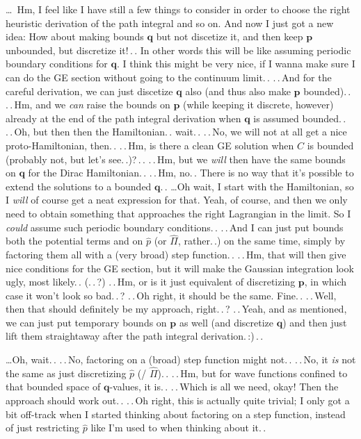 \documentclass{report}
\begin{document}
\ldots\ Hm, I feel like I have still a few things to consider in order to choose the right heuristic derivation of the path integral and so on. And now I just got a new idea: How about making bounds $\boldsymbol{q}$ but not discetize it, and then keep $\boldsymbol{p}$ unbounded, but discretize it!\,.\,. In other words this will be like assuming periodic boundary conditions for $\boldsymbol{q}$. I think this might be very nice, if I wanna make sure I can do the GE section without going to the continuum limit.\,. .\,.\,And for the careful derivation, we can just discetize $\boldsymbol{q}$ also (and thus also make $\boldsymbol{p}$ bounded).\,. .\,.\,Hm, and we \emph{can} raise the bounds on $\boldsymbol{p}$ (while keeping it discrete, however) already at the end of the path integral derivation when $\boldsymbol{q}$ is assumed bounded.\,. .\,.\,Oh, but then then the Hamiltonian.\,. wait.\,. .\,.\,No, we will not at all get a nice proto-Hamiltonian, then.\,. .\,.\,Hm, is there a clean GE solution when $C$ is bounded (probably not, but let's see.\,.)?\,.\,. .\,.\,Hm, but we \emph{will} then have the same bounds on $\boldsymbol{q}$ for the Dirac Hamiltonian.\,. 
.\,.\,Hm, no.\,. There is no way that it's possible to extend the solutions to a bounded $\boldsymbol{q}$.\,. \ldots Oh wait, I start with the Hamiltonian, so I \emph{will} of course get a neat expression for that. Yeah, of course, and then we only need to obtain something that approaches the right Lagrangian in the limit. So I \emph{could} assume such periodic boundary conditions.\,. .\,.\,And I can just put bounds both the potential terms and on $\hat p$ (or $\hat \Pi$, rather.\,.) on the same time, simply by factoring them all with a (very broad) step function.\,. .\,.\,Hm, that will then give nice conditions for the GE section, but it will make the Gaussian integration look ugly, most likely.\,. (.\,.\,?) %
.\,.\,Hm, or is it just equivalent of discretizing $\boldsymbol{p}$, in which case it won't look so bad.\,.\,? .\,.\,Oh right, it should be the same. Fine.\,. .\,.\,Well, then that should definitely be my approach, right.\,.\,? .\,.\,Yeah, and as mentioned, we can just put temporary bounds on $\boldsymbol{p}$ as well (and discretize $\boldsymbol{q}$) and then just lift them straightaway after the path integral derivation.\,:)\,.\,.  

\ldots Oh, wait.\,. .\,.\,No, factoring on a (broad) step function might not.\,. .\,.\,No, it \emph{is} not the same as just discretizing $\hat{p}$ (/ $\hat \Pi$).\,. .\,.\,Hm, but for wave functions confined to that bounded space of $\boldsymbol{q}$-values, it is.\,. .\,.\,Which is all we need, okay! Then the approach should work out.\,. %
.\,.\,Oh right, this is actually quite trivial; I only got a bit off-track when I started thinking about factoring on a step function, instead of just restricting $\hat p$ like I'm used to when thinking about it.\,.
\end{document}
